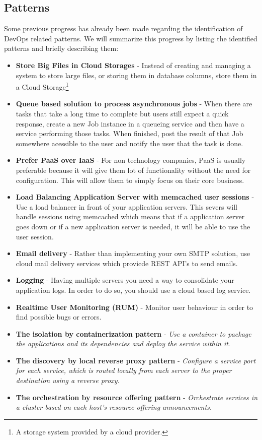      \subsection{Patterns}
      Some previous progress has already been made regarding the identification of DevOps related patterns. We will summarize this progress by listing the identified patterns and briefly describing them:
      \begin{itemize}
        \item \textbf{Store Big Files in Cloud Storages}\cite{Cukier2013} - Instead of creating and managing a system to store large files, or storing them in database columns, store them in a Cloud Storage\footnote{A storage system provided by a cloud provider.}
        \item \textbf{Queue based solution to process asynchronous jobs}\cite{Cukier2013} - When there are tasks that take a long time to complete but users still expect a quick response, create a new Job instance in a queueing service and then have a service performing those tasks. When finished, post the result of that Job somewhere acessible to the user and notify the user that the task is done.
        \item \textbf{Prefer PaaS over IaaS}\cite{Cukier2013} - For non technology companies, PaaS is usually preferable because it will give them lot of functionality without the need for configuration. This will allow them to simply focus on their core business.
        \item \textbf{Load Balancing Application Server with memcached user sessions}\cite{Cukier2013} - Use a load balancer in front of your application servers. This severs will handle sessions using memcached which means that if a application server goes down or if a new application server is needed, it will be able to use the user session.
        \item \textbf{Email delivery}\cite{Cukier2013} - Rather than implementing your own SMTP solution, use cloud mail delivery services which provicde REST API's to send emails.
        \item \textbf{Logging}\cite{Cukier2013} - Having multiple servers you need a way to consolidate your application logs. In order to do so, you should use a cloud based log service.
        \item \textbf{Realtime User Monitoring (RUM)}\cite{Cukier2013} - Monitor user behaviour in order to find possible bugs or errors.
        \item \textbf{The isolation by containerization pattern} \cite{Sousa2015} - \textit{Use a container to package the applications and its dependencies and deploy the service within it}.
        \item \textbf{The discovery by local reverse proxy pattern} \cite{Sousa2015} - \textit{Configure a service port for each service, which is routed locally from each server to the proper destination using a reverse proxy.}
        \item \textbf{The orchestration by resource offering pattern} \cite{Sousa2015} - \textit{Orchestrate services in a cluster based on each host’s resource-offering announcements.}

      \end{itemize}


